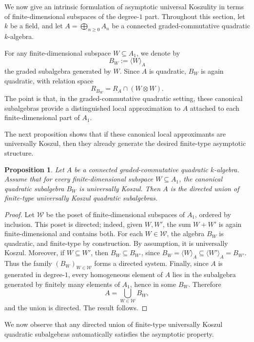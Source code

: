 \documentclass[11pt]{amsart}
\numberwithin{equation}{section}
\newtheorem{proposition}[theorem]{Proposition}
\theoremstyle{definition}
\begin{document}
	We now give an intrinsic formulation of asymptotic universal Koszulity in terms of finite-dimensional subspaces of the degree-$1$ part. Throughout this section, let $k$ be a field, and let $A = \bigoplus_{n \ge 0} A_n$ be a connected graded-commutative quadratic $k$-algebra.
	
	
	
	For any finite-dimensional subspace $W \subseteq A_1$, we denote by
	\[ B_W := \langle W \rangle_A\]
	the graded subalgebra generated by $W$. Since $A$ is quadratic, $B_W$
	is again quadratic, with relation space
	\[R_{B_W} = R_A \cap (W \otimes W).\]
	The point is that, in the graded-commutative quadratic setting, these canonical subalgebras provide a distinguished local approximation to \(A\) attached to each finite-dimensional part of \(A_1\).
	
	
	The next proposition shows that if these canonical local approximants are universally Koszul, then they already generate the desired finite-type asymptotic structure.
	
	\begin{proposition}
		\label{prop:b-implies-c}
		Let $A$ be a connected graded-commutative quadratic $k$-algebra. Assume that for every finite-dimensional subspace $W \subseteq A_1$, the canonical quadratic subalgebra $B_W$ is universally Koszul. Then $A$ is the directed union of finite-type universally Koszul quadratic subalgebras.
	\end{proposition}
	
	\begin{proof}
		Let $\mathcal{W}$ be the poset of finite-dimensional subspaces of $A_1$, ordered by inclusion. This poset is directed; indeed, given $W, W'$, the sum $W + W'$ is again finite-dimensional and contains both. For each $W \in \mathcal{W}$, the algebra $B_W$ is quadratic, and finite-type by construction. By assumption, it is universally Koszul. Moreover, if $W \subseteq W'$, then $B_W \subseteq B_{W'}$, since $B_W = \langle W \rangle_A \subseteq \langle W' \rangle_A = B_{W'}$. Thus the family $(B_W)_{W \in \mathcal{W}}$ forms a directed system. Finally, since $A$ is generated in degree-$1$, every homogeneous element of $A$ lies in the subalgebra generated by finitely many elements of $A_1$, hence in some $B_W$. Therefore
		\[	A = \bigcup_{W \in \mathcal{W}} B_W,\]
		and the union is directed. The result follows.
	\end{proof}
	
	
	We now observe that any directed union of finite-type universally Koszul quadratic subalgebras automatically satisfies the asymptotic property.
	
\end{document}
